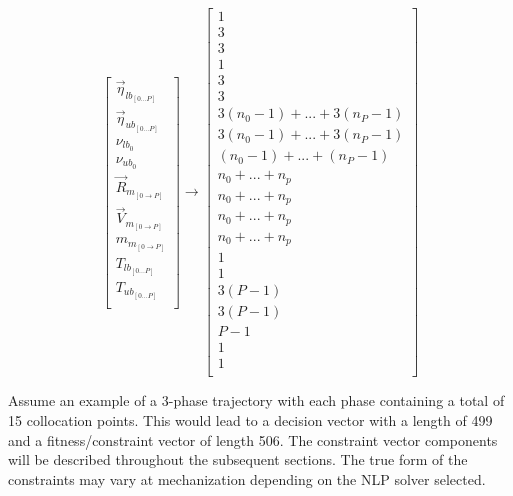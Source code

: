 \begin{multicols}{2}
\begin{equation}
\begin{bmatrix}
\vec{\eta}_{lb_{[0 ... P]}} \\
\vec{\eta}_{ub_{[0 ... P]}} \\
\nu_{lb_{0}} \\
\nu_{ub_{0}} \\
\vec{R}_{m_{[0 \rightarrow P]}} \\
\vec{V}_{m_{[0 \rightarrow P]}} \\
m_{m_{[0 \rightarrow P]}} \\
T_{lb_{[0 ... P]}} \\
T_{ub_{[0 ... P]}} \\
\end{bmatrix}
\rightarrow
\begin{bmatrix}
1 \\
3 \\
3 \\
1 \\
3 \\
3 \\
3(n_0-1) + ... + 3(n_P - 1) \\
3(n_0-1) + ... + 3(n_P - 1) \\
(n_0-1) + ... + (n_P - 1) \\
n_0 + ... + n_p \\
n_0 + ... + n_p \\
n_0 + ... + n_p \\
n_0 + ... + n_p \\
1 \\
1 \\
3 (P - 1) \\
3 (P - 1) \\
P - 1 \\
1 \\
1 \\
\end{bmatrix}
\end{equation} 
\end{multicols}
Assume an example of a 3-phase trajectory with each phase containing a total of 15 collocation points. This would lead to a decision vector with a length of 499 and a fitness/constraint vector of length  506. The constraint vector components will be described throughout the subsequent sections. The true form of the constraints may vary at mechanization depending on the NLP solver selected.


